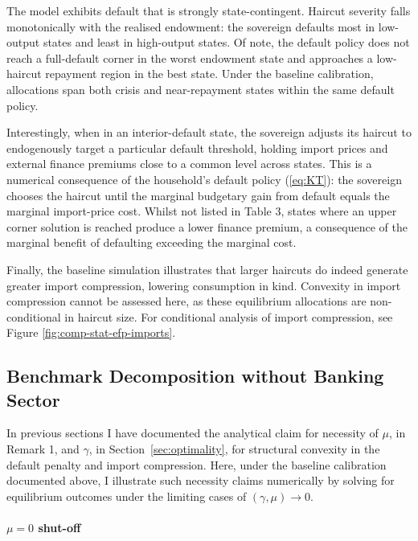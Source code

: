 \documentclass[11pt]{article}
\theoremstyle{definition}
\theoremstyle{plain}
\theoremstyle{remark}
\begin{document}


The model exhibits default that is strongly state-contingent. Haircut severity falls monotonically with the realised endowment: the sovereign defaults most in low-output states and least in high-output states. Of note, the default policy does not reach a full-default corner in the worst endowment state and approaches a low-haircut repayment region in the best state. Under the baseline calibration, allocations span both crisis and near-repayment states within the same default policy.

Interestingly, when in an interior-default state, the sovereign adjusts its haircut to endogenously target a particular default threshold, holding import prices and external finance premiums close to a common level across states. This is a numerical consequence of the household's default policy (\ref{eq:KT}): the sovereign chooses the haircut until the marginal budgetary gain from default equals the marginal import-price cost. Whilst not listed in Table 3, states where an upper corner solution is reached produce a lower finance premium, a consequence of the marginal benefit of defaulting exceeding the marginal cost.

Finally, the baseline simulation illustrates that larger haircuts do indeed generate  greater import compression, lowering consumption in kind. Convexity in import compression cannot be assessed here, as these equilibrium allocations are non-conditional in haircut size. For conditional analysis of import compression, see Figure \ref{fig:comp-stat-efp-imports}.

\subsection{Benchmark Decomposition without Banking Sector} \label{sec:mech_decomp}

In previous sections I have documented the analytical claim for necessity of $\mu$, in Remark 1, and $\gamma$, in Section~\ref{sec:optimality}, for structural convexity in the default penalty and import compression. Here, under the baseline calibration documented above, I illustrate such necessity claims numerically by solving for equilibrium outcomes under the limiting cases of $(\gamma, \mu) \to 0$.

\paragraph{$\mu=0$ shut-off}
\end{document}

